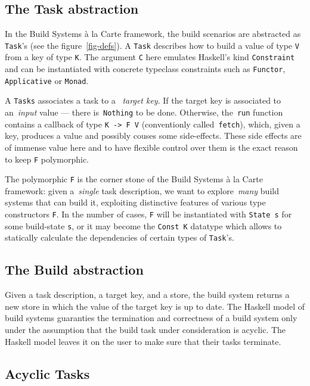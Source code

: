 \documentclass[sigplan,review]{acmart}\settopmatter{printfolios=true,printccs=false,printacmref=false}
\newcommand{\hs}{\texttt}
\begin{document}
\vspace{-3mm}
\subsection{The Task abstraction}

In the Build Systems \`a la Carte framework, the build scenarios are abstracted
as \hs{Task}'s (see the figure~\ref{fig-defs}). A \hs{Task}
describes how to build a value of type \hs{V} from a key of type \hs{K}.
The argument \hs{C} here emulates Haskell's kind \hs{Constraint} and can be
instantiated with concrete typeclass constraints such as \hs{Functor},
\hs{Applicative} or \hs{Monad}.

A \hs{Tasks} associates a task to a ~\emph{target key}.
If the target key is associated to an~\emph{input}
value --- there is~\hs{Nothing} to be done. Otherwise, the~\hs{run} function
contains a callback of type \hs{K -> F V} (conventionly called~\hs{fetch}),
which, given a key, produces a value and possibly couses some side-effects.
These side effects are of immense value here and to have flexible control over them
is the exact reason to keep \hs{F} polymorphic.

The polymorphic \hs{F} is the corner stone of the Build Systems \`a la Carte
framework: given a~\emph{single} task description, we want to explore~\emph{many}
build systems that can build it, exploiting distinctive features of various
type constructors \hs{F}. In the number of cases, \hs{F} will be instantiated
with \hs{State s} for some build-state \hs{s}, or it may become the
\hs{Const K} datatype which allows to statically calculate the dependencies of certain
types of \hs{Task}'s.

\vspace{-3mm}
\subsection{The Build abstraction}

Given a task description, a target key, and a store, the build
system returns a new store in which the value of the target key is up to date.
The Haskell model of build systems guaranties the termination and correctness of
a build system only under the assumption that the build task under
consideration is acyclic. The Haskell model leaves it on the user
to make sure that their tasks terminate.

\vspace{-3mm}
\subsection{Acyclic Tasks}
\end{document}
